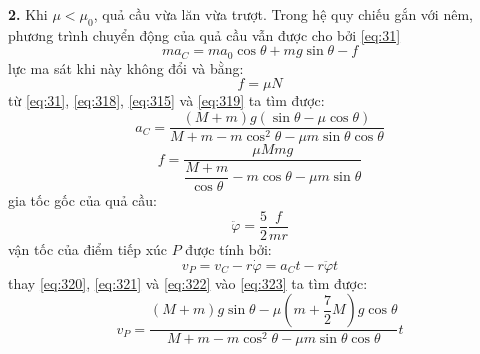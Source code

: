 \noindent\textbf{2.} Khi $\mu<\mu_{0}$, quả cầu vừa lăn vừa trượt. Trong hệ quy chiếu gắn với nêm, phương trình chuyển động của quả cầu vẫn được cho bởi \eqref{eq:31}
\begin{equation*}
  ma_{C}=ma_{0}\cos\theta+mg\sin\theta-f
\end{equation*}
lực ma sát khi này không đổi và bằng:
\begin{equation}
  \label{eq:319}
  f=\mu N
\end{equation}
từ \eqref{eq:31}, \eqref{eq:318}, \eqref{eq:315} và \eqref{eq:319} ta tìm được:
\begin{equation}
  \label{eq:320}
  a_{C}=\frac{(M+m)g(\sin\theta-\mu\cos\theta)}{M+m-m\cos^{2}\theta-\mu m\sin\theta\cos\theta}
\end{equation}
\begin{equation}
  \label{eq:321}
  f=\frac{\mu Mmg}{\dfrac{M+m}{\cos\theta}-m\cos\theta-\mu m\sin\theta}
\end{equation}
gia tốc gốc của quả cầu:
\begin{equation}
  \label{eq:322}
  \ddot{\varphi}=\frac{5}{2}\frac{f}{mr}
\end{equation}
vận tốc của điểm tiếp xúc $P$ được tính bởi:
\begin{equation}
  \label{eq:323}
  v_{P}=v_{C}-r\dot{\varphi}=a_{C}t-r\ddot{\varphi}t
\end{equation}
thay \eqref{eq:320}, \eqref{eq:321} và \eqref{eq:322} vào \eqref{eq:323} ta tìm được:
\begin{equation}
  \label{eq:324}
  v_{P}=\frac{(M+m)g\sin\theta-\mu(m+\dfrac{7}{2}M)g\cos\theta}{M+m-m\cos^{2}\theta-\mu m\sin\theta\cos\theta}t
\end{equation}